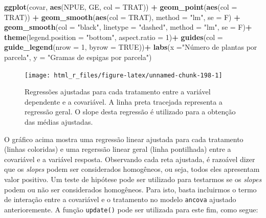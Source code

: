 \documentclass[
]{book}
\newenvironment{Shaded}{\begin{snugshade}}{\end{snugshade}}
\newcommand{\DataTypeTok}[1]{\textcolor[rgb]{0.13,0.29,0.53}{#1}}
\newcommand{\DecValTok}[1]{\textcolor[rgb]{0.00,0.00,0.81}{#1}}
\newcommand{\KeywordTok}[1]{\textcolor[rgb]{0.13,0.29,0.53}{\textbf{#1}}}
\newcommand{\NormalTok}[1]{#1}
\newcommand{\OperatorTok}[1]{\textcolor[rgb]{0.81,0.36,0.00}{\textbf{#1}}}
\newcommand{\OtherTok}[1]{\textcolor[rgb]{0.56,0.35,0.01}{#1}}
\newcommand{\StringTok}[1]{\textcolor[rgb]{0.31,0.60,0.02}{#1}}
\begin{document}
\begin{Shaded}
\begin{Highlighting}[]
\KeywordTok{ggplot}\NormalTok{(covar, }\KeywordTok{aes}\NormalTok{(NPUE, GE, }\DataTypeTok{col =}\NormalTok{ TRAT)) }\OperatorTok{+}
\StringTok{  }\KeywordTok{geom_point}\NormalTok{(}\KeywordTok{aes}\NormalTok{(}\DataTypeTok{col =}\NormalTok{ TRAT)) }\OperatorTok{+}
\StringTok{  }\KeywordTok{geom_smooth}\NormalTok{(}\KeywordTok{aes}\NormalTok{(}\DataTypeTok{col =}\NormalTok{ TRAT), }\DataTypeTok{method =} \StringTok{"lm"}\NormalTok{, }\DataTypeTok{se =}\NormalTok{ F) }\OperatorTok{+}
\StringTok{  }\KeywordTok{geom_smooth}\NormalTok{(}\DataTypeTok{col =} \StringTok{"black"}\NormalTok{, }\DataTypeTok{linetype =} \StringTok{"dashed"}\NormalTok{, }\DataTypeTok{method =} \StringTok{"lm"}\NormalTok{, }\DataTypeTok{se =}\NormalTok{ F)}\OperatorTok{+}
\StringTok{  }\KeywordTok{theme}\NormalTok{(}\DataTypeTok{legend.position =} \StringTok{"bottom"}\NormalTok{,}
        \DataTypeTok{aspect.ratio =} \DecValTok{1}\NormalTok{)}\OperatorTok{+}
\StringTok{  }\KeywordTok{guides}\NormalTok{(}\DataTypeTok{col =} \KeywordTok{guide_legend}\NormalTok{(}\DataTypeTok{nrow =} \DecValTok{1}\NormalTok{, }\DataTypeTok{byrow =} \OtherTok{TRUE}\NormalTok{))}\OperatorTok{+}
\StringTok{  }\KeywordTok{labs}\NormalTok{(}\DataTypeTok{x =}\StringTok{"Número de plantas por parcela"}\NormalTok{,}
       \DataTypeTok{y =} \StringTok{"Gramas de espigas por parcela"}\NormalTok{)}
\end{Highlighting}
\end{Shaded}

\begin{figure}

{\centering \texttt{[image: html\_r\_files/figure-latex/unnamed-chunk-198-1]} 

}

\caption{Regressões ajustadas para cada tratamento entre a variável dependente e a covariável. A linha preta tracejada representa a regressão geral. O slope desta regressão é utilizado para a obtenção das médias ajustadas.}\label{fig:unnamed-chunk-198}
\end{figure}

O gráfico acima mostra uma regressão linear ajustada para cada tratamento (linhas coloridas) e uma regerssão linear geral (linha pontilhada) entre a covariável e a variável resposta. Observando cada reta ajustada, é razoável dizer que os \emph{slopes} podem ser considerados homogêneos, ou seja, todos eles apresentam valor positivo. Um teste de hipótese pode ser utilizado para testarmos se os \emph{slopes} podem ou não ser considerados homogêneos. Para isto, basta incluirmos o termo de interação entre a covariável e o tratamento no modelo \texttt{ancova} ajustado anterioremente. A função \texttt{update()} pode ser utilizada para este fim, como segue:
\end{document}
